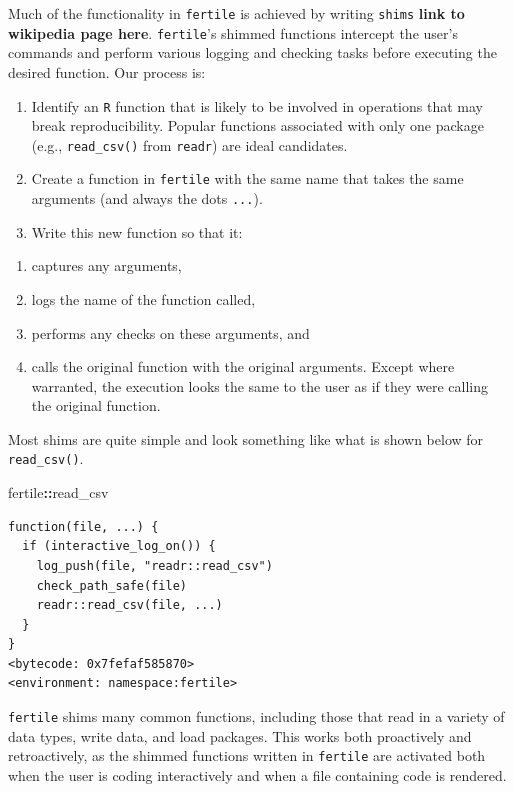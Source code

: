 \documentclass[12pt,twoside]{reedthesis}
\newenvironment{Shaded}{\begin{snugshade}}{\end{snugshade}}
\newcommand{\OperatorTok}[1]{\textcolor[rgb]{0.81,0.36,0.00}{\textbf{#1}}}
\newcommand{\NormalTok}[1]{#1}
\providecommand{\tightlist}{%
  \setlength{\itemsep}{0pt}\setlength{\parskip}{0pt}}
\begin{document}
Much of the functionality in \texttt{fertile} is achieved by writing
\texttt{shims} \textbf{link to wikipedia page here}. \texttt{fertile}'s
shimmed functions intercept the user's commands and perform various
logging and checking tasks before executing the desired function. Our
process is:
\begin{enumerate}
\def\labelenumi{\arabic{enumi}.}
\item
  Identify an \texttt{R} function that is likely to be involved in
  operations that may break reproducibility. Popular functions
  associated with only one package (e.g., \texttt{read\_csv()} from
  \texttt{readr}) are ideal candidates.
\item
  Create a function in \texttt{fertile} with the same name that takes
  the same arguments (and always the dots \texttt{...}).
\item
  Write this new function so that it:
\end{enumerate}
\begin{enumerate}
\def\labelenumi{\alph{enumi})}
\tightlist
\item
  captures any arguments,
\item
  logs the name of the function called,
\item
  performs any checks on these arguments, and
\item
  calls the original function with the original arguments. Except where
  warranted, the execution looks the same to the user as if they were
  calling the original function.
\end{enumerate}
Most shims are quite simple and look something like what is shown below
for \texttt{read\_csv()}.
\begin{Shaded}
\begin{Highlighting}[]
\NormalTok{fertile}\OperatorTok{::}\NormalTok{read_csv}
\end{Highlighting}
\end{Shaded}
\begin{verbatim}
function(file, ...) {
  if (interactive_log_on()) {
    log_push(file, "readr::read_csv")
    check_path_safe(file)
    readr::read_csv(file, ...)
  }
}
<bytecode: 0x7fefaf585870>
<environment: namespace:fertile>
\end{verbatim}
\texttt{fertile} shims many common functions, including those that read
in a variety of data types, write data, and load packages. This works
both proactively and retroactively, as the shimmed functions written in
\texttt{fertile} are activated both when the user is coding
interactively and when a file containing code is rendered.
\end{document}
